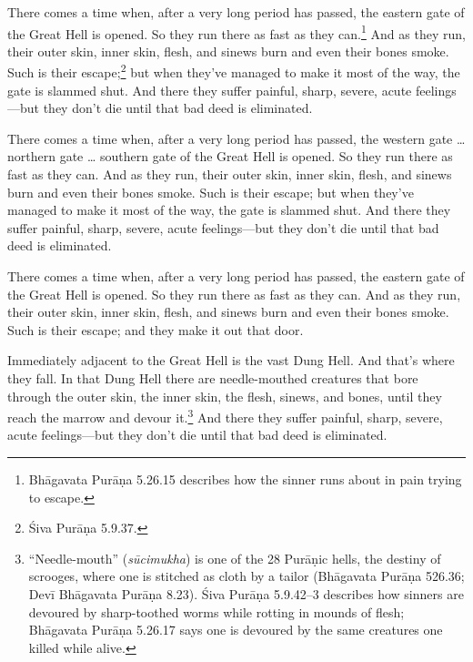 \documentclass[12pt,openany]{book}%
\begin{document}
There comes a time when, after a very long period has passed, the eastern gate of the Great Hell is opened. So they run there as fast as they can.\footnote{\textsanskrit{Bhāgavata} \textsanskrit{Purāṇa} 5.26.15 describes how the sinner runs about in pain trying to escape. } And as they run, their outer skin, inner skin, flesh, and sinews burn and even their bones smoke. Such is their escape;\footnote{Śiva \textsanskrit{Purāṇa} 5.9.37. } but when they’ve managed to make it most of the way, the gate is slammed shut. And there they suffer painful, sharp, severe, acute feelings—but they don’t die until that bad deed is eliminated. 

There comes a time when, after a very long period has passed, the western gate … northern gate … southern gate of the Great Hell is opened. So they run there as fast as they can. And as they run, their outer skin, inner skin, flesh, and sinews burn and even their bones smoke. Such is their escape; but when they’ve managed to make it most of the way, the gate is slammed shut. And there they suffer painful, sharp, severe, acute feelings—but they don’t die until that bad deed is eliminated. 

There comes a time when, after a very long period has passed, the eastern gate of the Great Hell is opened. So they run there as fast as they can. And as they run, their outer skin, inner skin, flesh, and sinews burn and even their bones smoke. Such is their escape; and they make it out that door. 

Immediately adjacent to the Great Hell is the vast Dung Hell. And that’s where they fall. In that Dung Hell there are needle-mouthed creatures that bore through the outer skin, the inner skin, the flesh, sinews, and bones, until they reach the marrow and devour it.\footnote{“Needle-mouth” (\textit{\textsanskrit{sūcimukha}}) is one of the 28 \textsanskrit{Purāṇic} hells, the destiny of scrooges, where one is stitched as cloth by a tailor (\textsanskrit{Bhāgavata} \textsanskrit{Purāṇa} 526.36; \textsanskrit{Devī} \textsanskrit{Bhāgavata} \textsanskrit{Purāṇa} 8.23). Śiva \textsanskrit{Purāṇa} 5.9.42–3 describes how sinners are devoured by sharp-toothed worms while rotting in mounds of flesh; \textsanskrit{Bhāgavata} \textsanskrit{Purāṇa} 5.26.17 says one is devoured by the same creatures one killed while alive. } And there they suffer painful, sharp, severe, acute feelings—but they don’t die until that bad deed is eliminated. 
\end{document}
